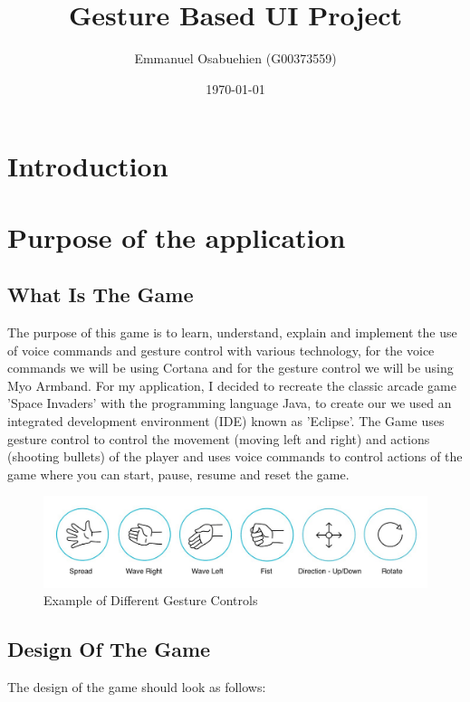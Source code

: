 \documentclass{article}
\title{Gesture Based UI Project}
\author{Emmanuel Osabuehien (G00373559)}
\date{\today}
\begin{document}
\maketitle

\section{Introduction}

\section{Purpose of the application}

\subsection{What Is The Game}

The purpose of this game is to learn, understand, explain and implement the use of voice commands and gesture control with various technology, for the voice commands we will be using Cortana and for the gesture control we will be using Myo Armband. For my application, I decided to recreate the classic arcade game 'Space Invaders' with the programming language Java, to create our we used an integrated development environment (IDE) known as 'Eclipse'. The Game uses gesture control to control the movement (moving left and right) and actions (shooting bullets) of the player and uses voice commands to control actions of the game where you can start, pause, resume and reset the game.

\begin{figure}[h]
  \includegraphics[width=\textwidth]{img/gestures.jpg}
  \centering
  \caption{Example of Different Gesture Controls}
  \label{fig: Myo Armband Gesture Controls}
\end{figure}

\subsection{Design Of The Game}

The design of the game should look as follows:
\end{document}

